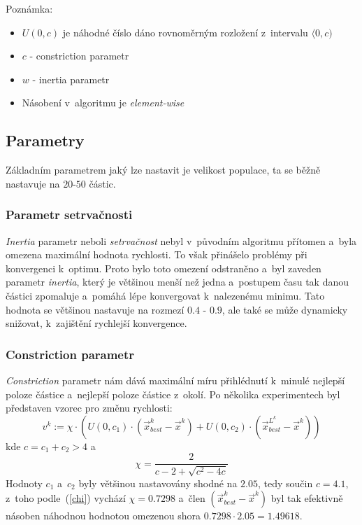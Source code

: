 \documentclass[12pt,a4paper,fleqn]{article}
\begin{document}
Poznámka:
\begin{itemize}
\item $U(0,c)$ je náhodné číslo dáno rovnoměrným rozložení z~intervalu $\langle 0, c)$
\item $c$ - constriction parametr
\item $w$ - inertia parametr
\item Násobení v~algoritmu je \textit{element-wise}
\end{itemize}

\subsection{Parametry}
Základním parametrem jaký lze nastavit je velikost populace, ta se běžně nastavuje na $20$-$50$ částic.

\subsubsection{Parametr setrvačnosti}
\textit{Inertia} parametr neboli \textit{setrvačnost} nebyl v~původním algoritmu přítomen a~byla omezena maximální hodnota rychlosti. To však přinášelo problémy při konvergenci k~optimu. Proto bylo toto omezení odstraněno a~byl zaveden parametr 
\textit{inertia}, který je většinou menší než jedna a~postupem času tak danou částici zpomaluje a~pomáhá lépe konvergovat k~nalezenému minimu. Tato hodnota se většinou nastavuje na rozmezí $0.4$ - $0.9$, ale také se může dynamicky snižovat, k~zajištění rychlejší konvergence.


\subsubsection{Constriction parametr}
\textit{Constriction} parametr nám dává maximální míru přihlédnutí k~minulé nejlepší poloze částice a~nejlepší poloze částice z~okolí. Po několika experimentech byl představen vzorec pro změnu rychlosti:
\begin{equation} \label{v-chi}
v^k :=  \chi \cdot \left( U(0,c_1) \cdot (\vec{x}^k_{best} - \vec{x}^k) + U(0,c_2) \cdot (\vec{x}^{L^k}_{best} -  \vec{x}^k) \right)
\end{equation}
kde $c = c_1 + c_2 > 4$
a~\begin{equation} \label{chi}
\chi = \frac{2}{c - 2 + \sqrt{c^2 - 4 c}}
\end{equation}
Hodnoty $c_1$ a~$c_2$ byly většinou nastavovány shodné na $2.05$, tedy součin $c = 4.1$, z~toho podle~(\ref{chi}) vychází $\chi = 0.7298$ a~člen $(\vec{x}^k_{best} - \vec{x}^k)$ byl tak efektivně násoben náhodnou hodnotou omezenou shora $0.7298 \cdot 2.05 = 1.49618$.
\end{document}
